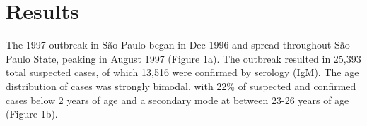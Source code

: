 \section{\texorpdfstring{\textbf{Results}}{Results}}\label{results}

The 1997 outbreak in S\~{a}o Paulo began in Dec 1996 and spread throughout
S\~{a}o Paulo State, peaking in August 1997 (Figure 1a). The outbreak
resulted in 25,393 total suspected cases, of which 13,516 were confirmed
by serology (IgM). The age distribution of cases was strongly bimodal,
with 22\% of suspected and confirmed cases below 2 years of age and a
secondary mode at between 23-26 years of age (Figure 1b).